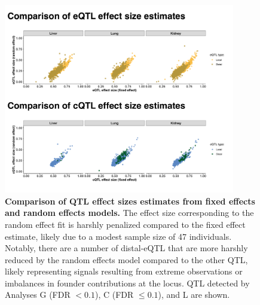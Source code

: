 \documentclass[10pt,letterpaper,twoside]{article}
\begin{document}
\begin{figure}[hp]
\renewcommand{\familydefault}{\sfdefault}\normalfont
\centering
\includegraphics[width=0.9\textwidth, trim={0in 0in 0in 0in}, clip]{figs/fixefvsranef_qtl.pdf}
\caption{\textbf{Comparison of QTL effect sizes estimates from fixed effects and random effects models.} 
The effect size corresponding to the random effect fit is harshly penalized compared to the fixed effect estimate, likely due to a modest sample size of 47 individuals. Notably, there are a number of distal-eQTL that are more harshly reduced by the random effects model compared to the other QTL, likely representing signals resulting from extreme observations or imbalances in founder contributions at the locus. QTL detected by Analyses G (FDR $< 0.1$), C (FDR $\le 0.1$), and L are shown.
\label{fig:qtl_effect_size_fixefvsranef}}
\end{figure}
\end{document}
